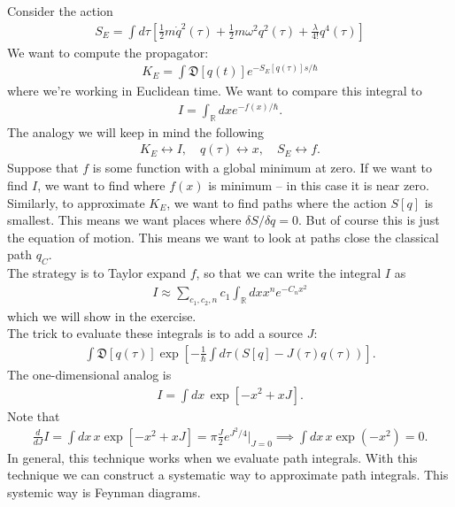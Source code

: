 \documentclass{book}
\theoremstyle{definition}
\newcommand{\R}{\mathbb{R}}
\newcommand{\f}[2]{\frac{#1}{#2}}
\newcommand{\lp}{\left(}
\newcommand{\rp}{\right)}
\newcommand{\lb}{\left[}
\newcommand{\rb}{\right]}
\begin{document}
Consider the action
\begin{align}
S_E = \int d\tau \lb \f{1}{2}m\dot{q}^2(\tau) + \f{1}{2}m\omega^2q^2(\tau) + \f{\lambda}{4!}q^4(\tau) \rb
\end{align}
We want to compute the propagator:
\begin{align}
K_E = \int \mathfrak{D}[q(t)] e^{-S_E[q(\tau)]s/\hbar}
\end{align}
where we're working in Euclidean time. We want to compare this integral to 
\begin{align}
I = \int_\R dx e^{-f(x)/\hbar}.
\end{align}
The analogy we will keep in mind the following
\begin{align}
K_E \leftrightarrow I, \quad q(\tau) \leftrightarrow x, \quad S_E \leftrightarrow f.
\end{align}
Suppose that $f$ is some function with a global minimum at zero. If we want to find $I$, we want to find where $f(x)$ is minimum -- in this case it is near zero. Similarly, to approximate $K_E$, we want to find paths where the action $S[q]$ is smallest. This means we want places where $\delta S / \delta q = 0$. But of course this is just the equation of motion. This means we want to look at paths close the classical path $q_C$. \\

The strategy is to Taylor expand $f$, so that we can write the integral $I$ as
\begin{align}
I \approx \sum_{c_1,c_2,n}c_1 \int_\R dx x^n e^{-C_n x^2}
\end{align}
which we will show in the exercise. \\

The trick to evaluate these integrals is to add a source $J$:
\begin{align}
\int \mathfrak{D}[q(\tau)] \exp\lb -\f{1}{\hbar} \int d\tau \lp S[q] - J(\tau)q(\tau)\rp \rb.
\end{align}
The one-dimensional analog is 
\begin{align}
I = \int dx \,\exp\lb -x^2 + xJ \rb.
\end{align}
Note that
\begin{align}
\f{d}{dJ}I = \int dx\, x \exp\lb -x^2 + xJ \rb = \pi \f{J}{2}e^{J^2/4}\bigg\vert_{J=0} \implies \int dx\, x\exp(-x^2) = 0.
\end{align}
In general, this technique works when we evaluate path integrals. With this technique we can construct a systematic way to approximate path integrals. This systemic way is Feynman diagrams. 
\end{document}

